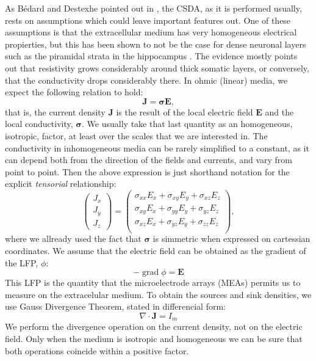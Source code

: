 \documentclass{article}
\newcommand{\Jd}{\mathbf{J}}
\newcommand{\EF}{\mathbf{E}}
\newcommand{\cond}{\boldsymbol{\sigma}}
\DeclareMathOperator{\grad}{grad}
\begin{document}
As Bédard and Destexhe pointed out in \cite{Bedard11}, the CSDA, as it
is performed usually, rests on
assumptions which could leave important features out. One of these 
assumptions is that the extracellular medium has very homogeneous 
electrical propierties, but this has been shown to not be
the case for dense neuronal layers such as the piramidal
strata in the hippocampus \cite{Holsheimer87, Lopez01, MarioPersonal}.
The evidence mostly points out that resistivity grows 
considerably around thick somatic layers, or conversely, that
the conductivity drops considerably there. In ohmic (linear) media,
we expect the following relation to hold:
\begin{equation}
\Jd=\cond \EF,
\end{equation}
that is, the current density $\Jd$ is the result of the
local electric field $\EF$ and the local conductivity, $\cond$.
We usually take that last quantity as an homogeneous, isotropic,
factor, at least over the scales that we are interested in.
The conductivity in inhomogeneous media can be rarely
simplified to a constant, as it can depend both from the direction
of the fields and currents, and vary from point to point. 
Then the above expression is just shorthand notation for the
explicit  \emph{tensorial} relationship:
\begin{equation}
  \begin{pmatrix}
    J_x \\
    J_y \\
    J_z
  \end{pmatrix}
  =
   \begin{pmatrix}
     \sigma_{xx}E_x+ \sigma_{xy}E_y+\sigma_{xz}E_z \\
     \sigma_{xy}E_x+ \sigma_{yy}E_y+\sigma_{yz}E_z \\
     \sigma_{xz}E_x+ \sigma_{yz}E_y+\sigma_{zz}E_z \\
  \end{pmatrix},
\end{equation}
where we allready used the fact that $\cond$ is simmetric when
expressed on cartessian coordinates.
We assume that the electric field can be obtained as the
gradient of the LFP, $\phi$:
\begin{equation}
  -\grad \phi=\EF
\end{equation}
This LFP is the quantity that the microelectrode arrays (MEAs) permits us
to measure on the extracelular medium.
To obtain the sources and sink densities, we use Gauss Divergence Theorem,
stated in differencial form:
\begin{equation}
\nabla \cdot \Jd =I_m
\end{equation}
We perform the divergence operation on the current density, not
on the electric field. Only when the medium is isotropic and homogeneous
we can be sure that both operations coincide within a positive factor.
\end{document}
